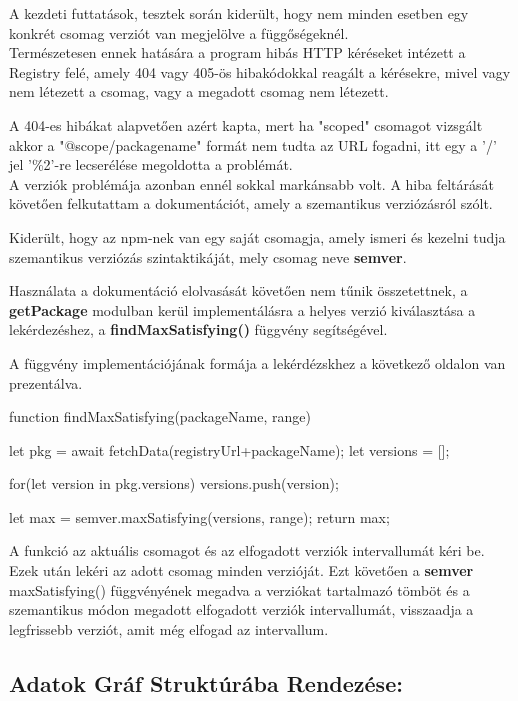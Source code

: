 A kezdeti futtatások, tesztek során kiderült, hogy nem minden esetben egy konkrét csomag verziót van megjelölve a függőségeknél.\\

Természetesen ennek hatására a program hibás HTTP kéréseket intézett a Registry felé, amely 404 vagy 405-ös hibakódokkal reagált a kérésekre, mivel vagy nem létezett a csomag, vagy a megadott csomag nem létezett. 

A 404-es hibákat alapvetően azért kapta, mert ha "scoped" csomagot vizsgált akkor a "@scope/packagename" formát nem tudta az URL fogadni, itt egy a '/' jel '\%2'-re lecserélése megoldotta a problémát.\\

A verziók problémája azonban ennél sokkal markánsabb volt. A hiba feltárását követően felkutattam a dokumentációt, amely a szemantikus verziózásról szólt. 

Kiderült, hogy az npm-nek van egy saját csomagja, amely ismeri és kezelni tudja szemantikus verziózás szintaktikáját, mely csomag neve \textbf{semver}. 

Használata a dokumentáció elolvasását követően nem tűnik összetettnek, a \textbf{getPackage} modulban kerül implementálásra a helyes verzió kiválasztása a lekérdezéshez, a \textbf{findMaxSatisfying()} függvény segítségével.

A függvény implementációjának formája a lekérdézskhez a következő oldalon van prezentálva.

\pagebreak

\begin{js}
function findMaxSatisfying(packageName, range){
	let pkg = await fetchData(registryUrl+packageName);
	let versions = [];
	
	for(let version in pkg.versions){
		versions.push(version);
	}
	
	let max = semver.maxSatisfying(versions, range);
	return max;
}
\end{js}

A funkció az aktuális csomagot és az elfogadott verziók intervallumát kéri be. Ezek után lekéri az adott csomag minden verzióját. Ezt követően a \textbf{semver} maxSatisfying() függvényének megadva a verziókat tartalmazó tömböt és a szemantikus módon megadott elfogadott verziók intervallumát, visszaadja a legfrissebb verziót, amit még elfogad az intervallum.

\subsection{Adatok Gráf Struktúrába Rendezése:}

